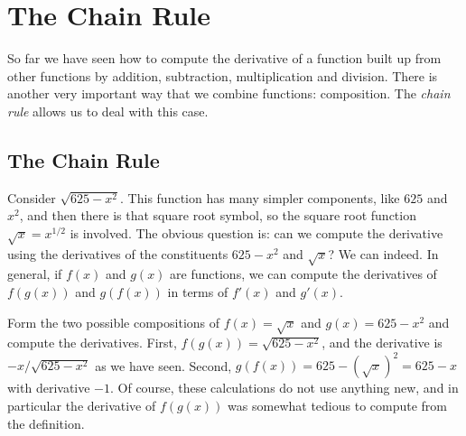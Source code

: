 
\chapter{The Chain Rule}

So far we have seen how to compute the derivative of a function built
up from other functions by addition, subtraction, multiplication and
division. There is another very important way that we combine
functions: composition. The \textit{chain rule} allows us to deal with
this case.

\section{The Chain Rule}


Consider $\sqrt{625-x^2}$. This function has many simpler
components, like $625$ and $x^2$, and then there is that square root
symbol, so the square root function $\sqrt{x}=x^{1/2}$ is
involved. The obvious question is: can we compute the derivative using
the derivatives of the constituents $625-x^2$ and $\sqrt{x}$?
We can indeed. In general, if $f(x)$ and $g(x)$ are functions, we can
compute the derivatives of $f(g(x))$ and $g(f(x))$ in terms of $f'(x)$
and $g'(x)$.

\begin{example} Form the two possible compositions of $f(x)=\sqrt{x}$ and
$g(x)=625-x^2$ and compute the derivatives.  First,
  $f(g(x))=\sqrt{625-x^2}$, and the derivative is $-x/\sqrt{625-x^2}$
  as we have seen. Second, $g(f(x))=625-(\sqrt{x})^2=625-x$ with
  derivative $-1$. Of course, these calculations do not use anything
  new, and in particular the derivative of $f(g(x))$ was somewhat
  tedious to compute from the definition.
\end{example}

